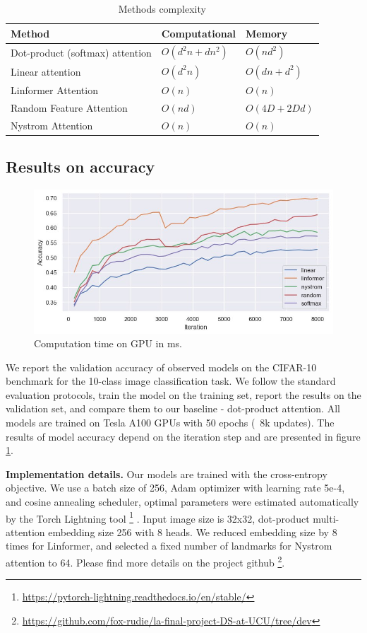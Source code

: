 \begin{table}
\centering
\begin{tabular}{l|l|l}
Method & Computational & Memory & \\\hline
Dot-product (softmax) attention & $O(d^2n+dn^2)$ &  $O(nd^2)$ \\
Linear attention & $O(d^2n)$ & $ O(dn+d^2) $  \\
Linformer Attention & $O(n)$ & $ O(n) $ \\
Random Feature Attention & $O(nd)$ & $O(4D + 2Dd)$ \\
Nystrom Attention & $O(n)$ & $O(n)$
\end{tabular}
\caption{\label{tab:mem-complexity}Methods complexity}
\end{table}


\subsection{Results on accuracy}

\begin{figure}[!h]
	\centering
	\includegraphics[scale=0.5]{attention-accuracy.jpg}
	\caption{Computation time on GPU in ms.}
	\label{fig:attention-accuracy}
\end{figure}

We report the validation accuracy of observed models on the CIFAR-10 \cite{cifar-10}  benchmark for the 10-class image classification task. We follow the standard evaluation protocols, train the model on the training set, report the results on the validation set, and compare them to our baseline - dot-product attention. All models are trained on Tesla A100 GPUs with 50 epochs (~8k updates). The results of model accuracy depend on the iteration step and are presented in figure \ref{fig:attention-accuracy}.

\textbf{Implementation details.} Our models are trained with the cross-entropy objective. We use a batch size of 256, Adam optimizer with learning rate 5e-4, and cosine annealing scheduler, optimal parameters were estimated automatically by the Torch Lightning tool \footnote{\url{https://pytorch-lightning.readthedocs.io/en/stable/}} . Input image size is 32x32, dot-product multi-attention embedding size 256 with 8 heads. We reduced embedding size by 8 times for Linformer, and selected a fixed number of landmarks for Nystrom attention to 64.
 Please find more details on the project github \footnote{\url{https://github.com/fox-rudie/la-final-project-DS-at-UCU/tree/dev}}.



